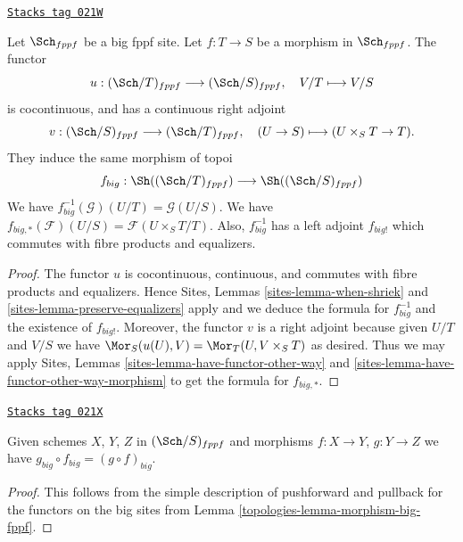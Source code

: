 \begin{lemma}
\label{topologies-lemma-morphism-big-fppf}
\href{https://stacks.math.columbia.edu/tag/021W}{\texttt{Stacks tag 021W}}

Let $\Sch_{fppf}$ be a big fppf site.
Let $f : T \to S$ be a morphism in $\Sch_{fppf}$.
The functor
$$
u : (\Sch/T)_{fppf} \longrightarrow (\Sch/S)_{fppf},
\quad
V/T \longmapsto V/S
$$
is cocontinuous, and has a continuous right adjoint
$$
v : (\Sch/S)_{fppf} \longrightarrow (\Sch/T)_{fppf},
\quad
(U \to S) \longmapsto (U \times_S T \to T).
$$
They induce the same morphism of topoi
$$
f_{big} :
\Sh((\Sch/T)_{fppf})
\longrightarrow
\Sh((\Sch/S)_{fppf})
$$
We have $f_{big}^{-1}(\mathcal{G})(U/T) = \mathcal{G}(U/S)$.
We have $f_{big, *}(\mathcal{F})(U/S) = \mathcal{F}(U \times_S T/T)$.
Also, $f_{big}^{-1}$ has a left adjoint $f_{big!}$ which commutes with
fibre products and equalizers.
\end{lemma}

\begin{proof}
The functor $u$ is cocontinuous, continuous, and commutes with fibre products
and equalizers. Hence
Sites, Lemmas \ref{sites-lemma-when-shriek} and
\ref{sites-lemma-preserve-equalizers}
apply and we deduce the formula
for $f_{big}^{-1}$ and the existence of $f_{big!}$. Moreover,
the functor $v$ is a right adjoint because given $U/T$ and $V/S$
we have $\Mor_S(u(U), V) = \Mor_T(U, V \times_S T)$
as desired. Thus we may apply
Sites, Lemmas \ref{sites-lemma-have-functor-other-way} and
\ref{sites-lemma-have-functor-other-way-morphism} to get the
formula for $f_{big, *}$.
\end{proof}

\begin{lemma}
\label{topologies-lemma-composition-fppf}
\href{https://stacks.math.columbia.edu/tag/021X}{\texttt{Stacks tag 021X}}

Given schemes $X$, $Y$, $Z$ in $(\Sch/S)_{fppf}$
and morphisms $f : X \to Y$, $g : Y \to Z$ we have
$g_{big} \circ f_{big} = (g \circ f)_{big}$.
\end{lemma}

\begin{proof}

This follows from the simple description of pushforward
and pullback for the functors on the big sites from
Lemma \ref{topologies-lemma-morphism-big-fppf}.
\end{proof}

